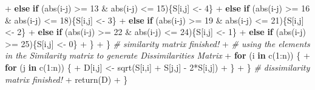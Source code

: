 \documentclass[
]{article}
\newenvironment{Shaded}{\begin{snugshade}}{\end{snugshade}}
\newcommand{\CommentTok}[1]{\textcolor[rgb]{0.56,0.35,0.01}{\textit{#1}}}
\newcommand{\ControlFlowTok}[1]{\textcolor[rgb]{0.13,0.29,0.53}{\textbf{#1}}}
\newcommand{\DecValTok}[1]{\textcolor[rgb]{0.00,0.00,0.81}{#1}}
\newcommand{\FunctionTok}[1]{\textcolor[rgb]{0.00,0.00,0.00}{#1}}
\newcommand{\NormalTok}[1]{#1}
\newcommand{\OtherTok}[1]{\textcolor[rgb]{0.56,0.35,0.01}{#1}}
\newcommand{\SpecialCharTok}[1]{\textcolor[rgb]{0.00,0.00,0.00}{#1}}
\begin{document}
\begin{Shaded}
\begin{Highlighting}[]
\SpecialCharTok{+}       \ControlFlowTok{else} \ControlFlowTok{if}\NormalTok{ (}\FunctionTok{abs}\NormalTok{(i}\SpecialCharTok{{-}}\NormalTok{j) }\SpecialCharTok{\textgreater{}=} \DecValTok{13} \SpecialCharTok{\&} \FunctionTok{abs}\NormalTok{(i}\SpecialCharTok{{-}}\NormalTok{j) }\SpecialCharTok{\textless{}=} \DecValTok{15}\NormalTok{)\{S[i,j] }\OtherTok{\textless{}{-}} \DecValTok{4}\NormalTok{\}}
\SpecialCharTok{+}       \ControlFlowTok{else} \ControlFlowTok{if}\NormalTok{ (}\FunctionTok{abs}\NormalTok{(i}\SpecialCharTok{{-}}\NormalTok{j) }\SpecialCharTok{\textgreater{}=} \DecValTok{16} \SpecialCharTok{\&} \FunctionTok{abs}\NormalTok{(i}\SpecialCharTok{{-}}\NormalTok{j) }\SpecialCharTok{\textless{}=} \DecValTok{18}\NormalTok{)\{S[i,j] }\OtherTok{\textless{}{-}} \DecValTok{3}\NormalTok{\}}
\SpecialCharTok{+}       \ControlFlowTok{else} \ControlFlowTok{if}\NormalTok{ (}\FunctionTok{abs}\NormalTok{(i}\SpecialCharTok{{-}}\NormalTok{j) }\SpecialCharTok{\textgreater{}=} \DecValTok{19} \SpecialCharTok{\&} \FunctionTok{abs}\NormalTok{(i}\SpecialCharTok{{-}}\NormalTok{j) }\SpecialCharTok{\textless{}=} \DecValTok{21}\NormalTok{)\{S[i,j] }\OtherTok{\textless{}{-}} \DecValTok{2}\NormalTok{\}}
\SpecialCharTok{+}       \ControlFlowTok{else} \ControlFlowTok{if}\NormalTok{ (}\FunctionTok{abs}\NormalTok{(i}\SpecialCharTok{{-}}\NormalTok{j) }\SpecialCharTok{\textgreater{}=} \DecValTok{22} \SpecialCharTok{\&} \FunctionTok{abs}\NormalTok{(i}\SpecialCharTok{{-}}\NormalTok{j) }\SpecialCharTok{\textless{}=} \DecValTok{24}\NormalTok{)\{S[i,j] }\OtherTok{\textless{}{-}} \DecValTok{1}\NormalTok{\}}
\SpecialCharTok{+}       \ControlFlowTok{else} \ControlFlowTok{if}\NormalTok{ (}\FunctionTok{abs}\NormalTok{(i}\SpecialCharTok{{-}}\NormalTok{j) }\SpecialCharTok{\textgreater{}=} \DecValTok{25}\NormalTok{)\{S[i,j] }\OtherTok{\textless{}{-}} \DecValTok{0}\NormalTok{\}}
\SpecialCharTok{+}\NormalTok{     \}}
\SpecialCharTok{+}\NormalTok{   \} }\CommentTok{\# similarity matrix finished!}
\SpecialCharTok{+}   \CommentTok{\# using the elements in the Similarity matrix to generate Dissimilarities Matrix}
\SpecialCharTok{+}   \ControlFlowTok{for}\NormalTok{ (i }\ControlFlowTok{in} \FunctionTok{c}\NormalTok{(}\DecValTok{1}\SpecialCharTok{:}\NormalTok{n)) \{}
\SpecialCharTok{+}     \ControlFlowTok{for}\NormalTok{ (j }\ControlFlowTok{in} \FunctionTok{c}\NormalTok{(}\DecValTok{1}\SpecialCharTok{:}\NormalTok{n)) \{}
\SpecialCharTok{+}\NormalTok{       D[i,j] }\OtherTok{\textless{}{-}} \FunctionTok{sqrt}\NormalTok{(S[i,i] }\SpecialCharTok{+}\NormalTok{ S[j,j] }\SpecialCharTok{{-}} \DecValTok{2}\SpecialCharTok{*}\NormalTok{S[i,j])}
\SpecialCharTok{+}\NormalTok{     \}}
\SpecialCharTok{+}\NormalTok{   \} }\CommentTok{\# dissimilarity matrix finished!}
\SpecialCharTok{+}   \FunctionTok{return}\NormalTok{(D)}
\SpecialCharTok{+}\NormalTok{ \}}
\end{Highlighting}
\end{Shaded}
\end{document}
